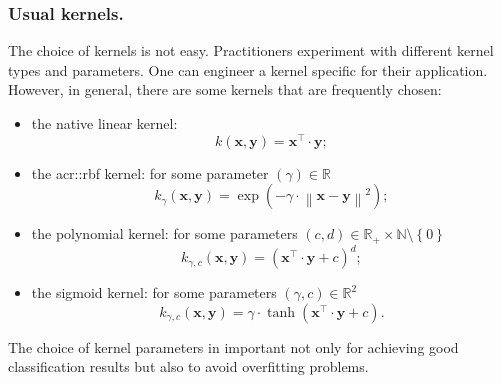         \subsubsection{Usual kernels.}
            The choice of kernels is not easy.
            Practitioners experiment with different kernel types and parameters.
            One can engineer a kernel specific for their application.
            However, in general, there are some kernels that are frequently chosen:
            \begin{itemize}
                \item the native linear kernel:
                \begin{equation}
                    \label{eq::linear_kernel}
                    k(\bm{x}, \bm{y}) = \bm{x}^\intercal \cdot \bm{y};
                \end{equation}
                \item the \gls{acr::rbf} kernel: for some parameter $(\gamma) \in \mathbb{R}$
                \begin{equation}
                    \label{eq::rbf_kernel}
                    k_{\gamma}(\bm{x}, \bm{y}) = \exp\left(-\gamma \cdot \left\lVert \bm{x} - \bm{y} \right\rVert^2\right);
                \end{equation}
                \item the polynomial kernel: for some parameters $(c, d) \in \mathbb{R}_+ \times \mathbb{N} \setminus \left\{0\right\} $
                \begin{equation}
                    \label{eq::polynomial_kernel}
                    k_{\gamma, c}(\bm{x}, \bm{y}) = (\bm{x}^\intercal \cdot \bm{y} + c)^d;
                \end{equation}
                \item the sigmoid kernel: for some parameters $(\gamma, c) \in \mathbb{R}^2$
                \begin{equation}
                    \label{eq::sigmoid_kernel}
                    k_{\gamma, c}(\bm{x}, \bm{y}) = \gamma \cdot \tanh(\bm{x}^\intercal \cdot \bm{y} + c).
                \end{equation}
            \end{itemize}
            The choice of kernel parameters in important not only for achieving good classification results but also to avoid overfitting problems.

